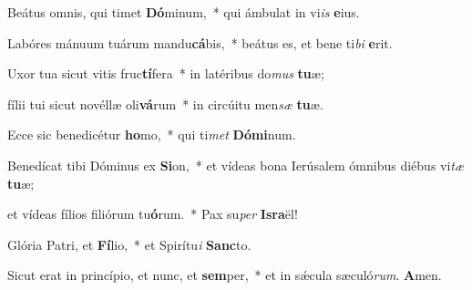 \item Beátus omnis, qui timet \textbf{Dó}minum,~* qui ámbulat in vi\textit{is} \textbf{e}ius.

\item Labóres mánuum tuárum mandu\textbf{cá}bis,~* beátus es, et bene ti\textit{bi} \textbf{e}rit.

\item Uxor tua sicut vitis fruc\textbf{tí}fera~* in latéribus do\textit{mus} \textbf{tu}æ;

\item fílii tui sicut novéllæ oli\textbf{vá}rum~* in circúitu men\textit{sæ} \textbf{tu}æ.

\item Ecce sic benedicétur \textbf{ho}mo,~* qui ti\textit{met} \textbf{Dó}\textbf{mi}num.

\item Benedícat tibi Dóminus ex \textbf{Si}on,~* et vídeas bona Ierúsalem ómnibus diébus vi\textit{tæ} \textbf{tu}æ;

\item et vídeas fílios filiórum tu\textbf{ó}rum.~* Pax su\textit{per} \textbf{Is}\textbf{ra}ël!

\item Glória Patri, et \textbf{Fí}lio,~* et Spirítu\textit{i} \textbf{Sanc}to.

\item Sicut erat in princípio, et nunc, et \textbf{sem}per,~* et in sǽcula sæculó\textit{rum}. \textbf{A}men.